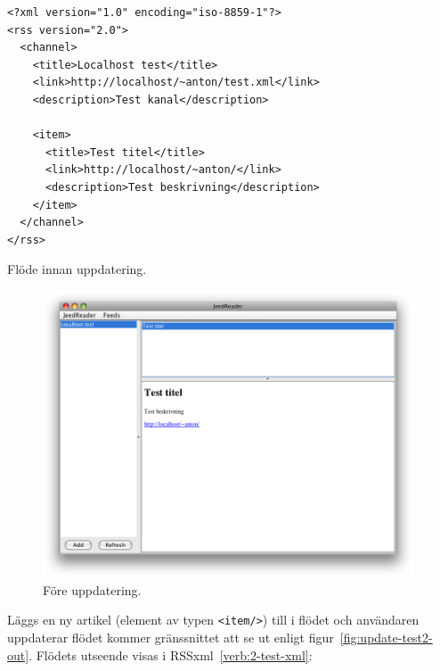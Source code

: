 \documentclass[titlepage, twoside, a4paper, 12pt]{article}
\begin{document}
\begin{program}
\begin{footnotesize}
\begin{verbatim}
<?xml version="1.0" encoding="iso-8859-1"?>
<rss version="2.0">
  <channel>
    <title>Localhost test</title>
    <link>http://localhost/~anton/test.xml</link>
    <description>Test kanal</description>

    <item>
      <title>Test titel</title>
      <link>http://localhost/~anton/</link>
      <description>Test beskrivning</description>
    </item>
  </channel>
</rss>
\end{verbatim}
\end{footnotesize}
\caption{Flöde innan uppdatering.}
\label{verb:1-test-xml}
\end{program}

\begin{figure}[H]
  \begin{center}
    \includegraphics[width=110mm]{images/update-test1-out.png}
    \caption{Före uppdatering.}
    \label{fig:update-test1-out}
  \end{center}
\end{figure}

Läggs en ny artikel (element av typen \verb!<item/>!) till i flödet
och användaren uppdaterar flödet kommer gränssnittet att se ut enligt
figur~\ref{fig:update-test2-out}. Flödets utseende visas i
RSSxml~\ref{verb:2-test-xml}:
\end{document}
